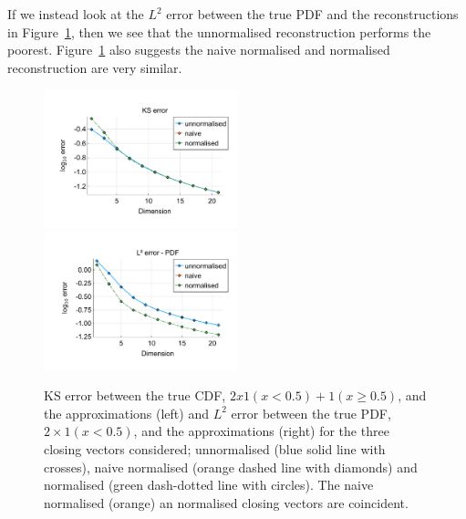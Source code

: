 \begin{example}
If we instead look at the \(L^2\) error between the true PDF and the reconstructions in Figure~\ref{fig: fun 2 ks error qbdrap closing vecs}, then we see that the unnormalised reconstruction performs the poorest. Figure~\ref{fig: fun 2 ks error qbdrap closing vecs} also suggests the naive normalised and normalised reconstruction are very similar. 
\begin{figure}[h]
	\centering
	\includegraphics[width=0.5\textwidth,trim={1.25cm 0.8cm 0.25cm 1.25cm},clip]{chapter6/figs/qbdrap_closing_vec/fun2/ks_error_formatted.pdf}%
	\includegraphics[width=0.5\textwidth,trim={1.25cm 0.8cm 0.25cm 1.25cm},clip]{chapter6/figs/qbdrap_closing_vec/fun2/l2_pdf_error_formatted.pdf}
	\caption{KS error between the true CDF, \(2x1(x<0.5)+1(x\geq 0.5)\), and the approximations (left) and \(L^2\) error between the true PDF, \(2\times 1(x<0.5)\), and the approximations (right) for the three closing vectors considered; unnormalised (blue solid line with crosses), naive normalised (orange dashed line with diamonds) and normalised (green dash-dotted line with circles). The naive normalised (orange) an normalised closing vectors are coincident.}
	\label{fig: fun 2 ks error qbdrap closing vecs}
\end{figure}
\exampleFloatBarrier
\end{example}

